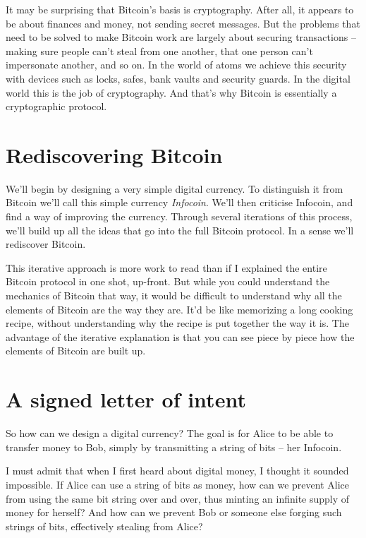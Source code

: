 \documentclass[12pt]{book}
\newcounter{problem}[chapter]
\begin{document}
%
%
It may be surprising that Bitcoin's basis is cryptography.  After all,
it appears to be about finances and money, not sending secret
messages.  But the problems that need to be solved to make Bitcoin
work are largely about securing transactions -- making sure people
can't steal from one another, that one person can't impersonate
another, and so on.  In the world of atoms we achieve this security
with devices such as locks, safes, bank vaults and security guards.
In the digital world this is the job of cryptography.  And that's why
Bitcoin is essentially a cryptographic protocol.

\section{Rediscovering Bitcoin}

We'll begin by designing a very simple digital currency.  To
distinguish it from Bitcoin we'll call this simple currency
\emph{Infocoin}.  We'll then criticise Infocoin, and find a way of
improving the currency.  Through several iterations of this process,
we'll build up all the ideas that go into the full Bitcoin protocol.
In a sense we'll rediscover Bitcoin.

This iterative approach is more work to read than if I explained the
entire Bitcoin protocol in one shot, up-front.  But while you could
understand the mechanics of Bitcoin that way, it would be difficult to
understand why all the elements of Bitcoin are the way they are.  It'd
be like memorizing a long cooking recipe, without understanding why
the recipe is put together the way it is.  The advantage of the
iterative explanation is that you can see piece by piece how the
elements of Bitcoin are built up.

\section{A signed letter of intent}

So how can we design a digital currency?  The goal is for Alice to be
able to transfer money to Bob, simply by transmitting a string of bits
-- her Infocoin.

I must admit that when I first heard about digital money, I thought it
sounded impossible.  If Alice can use a string of bits as money, how
can we prevent Alice from using the same bit string over and over,
thus minting an infinite supply of money for herself?  And how can we
prevent Bob or someone else forging such strings of bits, effectively
stealing from Alice?
\end{document}

